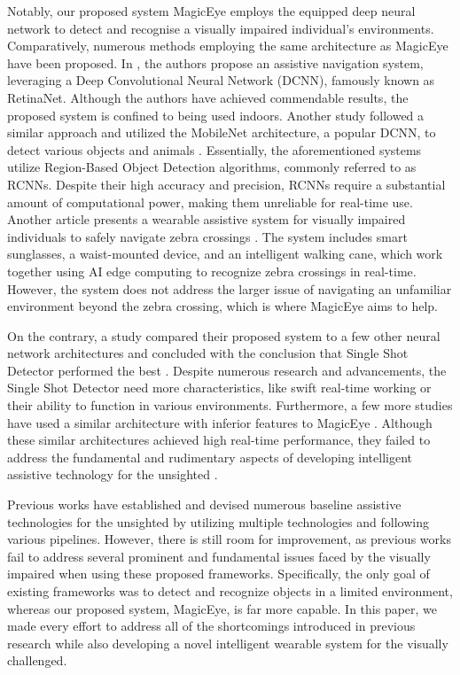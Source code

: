 \documentclass[journal,12pt,onecolumn,letterpaper]{IEEEtran}
\begin{document}
Notably, our proposed system MagicEye employs the equipped deep neural network to detect and recognise a visually impaired individual's environments. Comparatively, numerous methods employing the same architecture as MagicEye have been proposed. In \cite{afif_evaluation_2020}, the authors propose an assistive navigation system, leveraging a Deep Convolutional Neural Network (DCNN), famously known as RetinaNet. Although the authors have achieved commendable results, the proposed system is confined to being used indoors. Another study followed a similar approach and utilized the MobileNet architecture, a popular DCNN, to detect various objects and animals \cite{khan_ai-based_2020}. Essentially, the aforementioned systems utilize Region-Based Object Detection algorithms, commonly referred to as RCNNs. Despite their high accuracy and precision, RCNNs require a substantial amount of computational power, making them unreliable for real-time use. Another article presents a wearable assistive system for visually impaired individuals to safely navigate zebra crossings \cite{9253595}. The system includes smart sunglasses, a waist-mounted device, and an intelligent walking cane, which work together using AI edge computing to recognize zebra crossings in real-time. However, the system does not address the larger issue of navigating an unfamiliar environment beyond the zebra crossing, which is where MagicEye aims to help. 





On the contrary, a study compared their proposed system to a few other neural network architectures and concluded with the conclusion that Single Shot Detector performed the best \cite{dascalu_usability_2017}. Despite numerous research and advancements, the Single Shot Detector need more characteristics, like swift real-time working or their ability to function in various environments. Furthermore, a few more studies have used a similar architecture with inferior features to MagicEye \cite{shahira_obstacle_2019-1, joshi_yolo-v3_2020}. Although these similar architectures achieved high real-time performance, they failed to address the fundamental and rudimentary aspects of developing intelligent assistive technology for the unsighted \cite{shahira_obstacle_2019-1, joshi_yolo-v3_2020}.

Previous works have established and devised numerous baseline assistive technologies for the unsighted by utilizing multiple technologies and following various pipelines. However, there is still room for improvement, as previous works fail to address several prominent and fundamental issues faced by the visually impaired when using these proposed frameworks. Specifically, the only goal of existing frameworks was to detect and recognize objects in a limited environment, whereas our proposed system, MagicEye, is far more capable. In this paper, we made every effort to address all of the shortcomings introduced in previous research while also developing a novel intelligent wearable system for the visually challenged.
\end{document}
